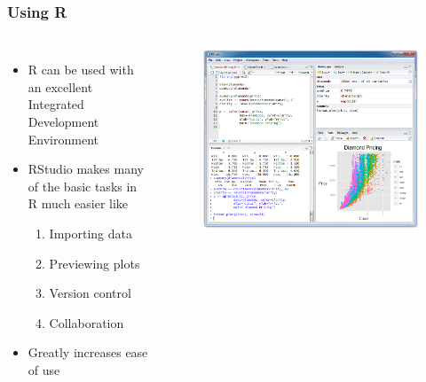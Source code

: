 \documentclass[12pt,handout]{beamer}
\begin{document}
\begin{frame}
\frametitle{Using R}
  \begin{columns}
  \begin{itemize}
  \item R can be used with an excellent Integrated Development Environment 
  \item RStudio makes many of the basic tasks in R much easier like
    \begin{enumerate}
    \item Importing data
    \item Previewing plots
    \item Version control 
    \item Collaboration
    \end{enumerate}
  \item Greatly increases ease of use
  \end{itemize}
  \begin{center}
  \begin{figure}
  \includegraphics{rstudio-windows.png}
  \end{figure}
  \end{center}
\end{columns}
\end{frame}
\end{document}
